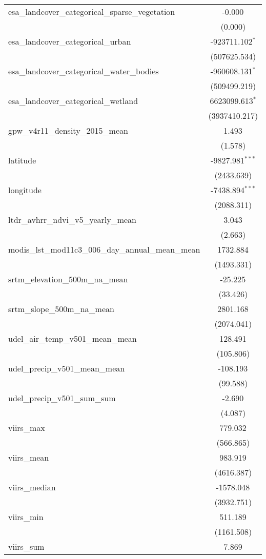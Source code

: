 \begin{table}[!htbp]
\begin{tabular}{@{\extracolsep{5pt}}lc}
 esa_landcover_categorical_sparse_vegetation & -0.000$^{}$ \\
  & (0.000) \\
 esa_landcover_categorical_urban & -923711.102$^{*}$ \\
  & (507625.534) \\
 esa_landcover_categorical_water_bodies & -960608.131$^{*}$ \\
  & (509499.219) \\
 esa_landcover_categorical_wetland & 6623099.613$^{*}$ \\
  & (3937410.217) \\
 gpw_v4r11_density_2015_mean & 1.493$^{}$ \\
  & (1.578) \\
 latitude & -9827.981$^{***}$ \\
  & (2433.639) \\
 longitude & -7438.894$^{***}$ \\
  & (2088.311) \\
 ltdr_avhrr_ndvi_v5_yearly_mean & 3.043$^{}$ \\
  & (2.663) \\
 modis_lst_mod11c3_006_day_annual_mean_mean & 1732.884$^{}$ \\
  & (1493.331) \\
 srtm_elevation_500m_na_mean & -25.225$^{}$ \\
  & (33.426) \\
 srtm_slope_500m_na_mean & 2801.168$^{}$ \\
  & (2074.041) \\
 udel_air_temp_v501_mean_mean & 128.491$^{}$ \\
  & (105.806) \\
 udel_precip_v501_mean_mean & -108.193$^{}$ \\
  & (99.588) \\
 udel_precip_v501_sum_sum & -2.690$^{}$ \\
  & (4.087) \\
 viirs_max & 779.032$^{}$ \\
  & (566.865) \\
 viirs_mean & 983.919$^{}$ \\
  & (4616.387) \\
 viirs_median & -1578.048$^{}$ \\
  & (3932.751) \\
 viirs_min & 511.189$^{}$ \\
  & (1161.508) \\
 viirs_sum & 7.869$^{}$ \\

\end{tabular}
\end{table}
